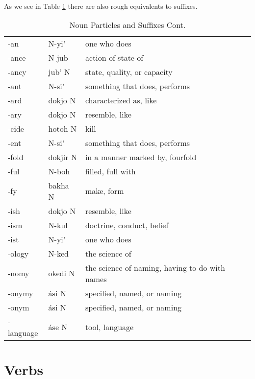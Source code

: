 As we see in Table \ref{table:suffixes_1} there are also rough equivalents to \english suffixes. 
\begin{table}[ht]
	\caption{Noun Particles and Suffixes Cont.}
	\centering
	\begin{tabular}{ l l l }
		\toprule
		-an & N-yi' & one who does \\
		-ance & N-jub & action of state of \\
		-ancy & jub' N & state, quality, or capacity \\
		-ant & N-si' & something that does, performs \\
		-ard & dokjo N & characterized as, like \\
		-ary & dokjo N & resemble, like \\
		-cide & hotoh N & kill \\
		-ent & N-si' & something that does, performs \\
		-fold & dokjir N & in a manner marked by, fourfold \\
		-ful & N-boh & filled, full with \\
		-fy & bakha N & make, form \\
		-ish & dokjo N & resemble, like \\
		-ism & N-kul & doctrine, conduct, belief \\
		-ist & N-yi' & one who does \\
		-ology & N-ked & the science of \\
		-nomy & okedi N & the science of naming, having to do with names \\
		-onymy & ási N & specified, named, or naming \\
		-onym & ási N & specified, named, or naming \\
		-language & áse N & tool, language \\

		\bottomrule
	\end{tabular}
	\label{table:suffixes_1}
\end{table}



\clearpage

\section*{Verbs }

